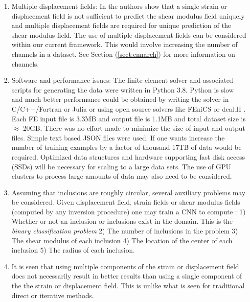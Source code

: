 \documentclass[12pt]{article}
\begin{document}
\begin{enumerate}
\item{Multiple displacement fields: In \cite{paper:barbonegokhale,paper:barbonebamber} the authors show that a single strain or displacement field is not sufficient to predict the shear modulus field uniquely and multiple displacement fields are required for unique prediction of the shear modulus field. The use of multiple displacement fields can be considered within our current framework. This would involve increasing the number of channels in a dataset. See Section (\ref{sect:cnnarch}) for more information on channels.} 
\item{Software and performance issues: The finite element solver and associated scripts for generating the data were written in Python 3.8. Python is slow and much better performance could be obtained by writing the solver in C/C++/Fortran or Julia or using open source solvers like FEniCS \cite{paper:fenics} or deal.II \cite{misc:deal.ii}. Each FE input file is 3.3MB and output file is 1.1MB and total dataset size is $\approx$  20GB. There was no effort made to minimize the size of input and output files. Simple text based JSON files were used. If one wants increase the number of training examples by a factor of thousand 17TB of data would be required. Optimized data structures and hardware supporting fast disk access (SSDs) will be necessary for scaling to a large data sets. The use of GPU clusters to process large amounts of data may also need to be considered. }
\item{Assuming that inclusions are roughly circular, several auxiliary problems may be considered. Given displacement field, strain fields or shear modulus fields (computed by any inversion procedure) one may train a CNN to compute : 1) Whether or not an inclusion or inclusions exist  in the domain. This is the \textit{binary classification problem} 2) The number of inclusions in the problem 3) The shear modulus of each inclusion 4) The location of the center of each inclusion 5) The radius of each inclusion. }
\item{It is seen that using multiple components of the strain or displacement field does not necessarily result in better results than using a single component of the the strain or displacement field. This is unlike what is seen for traditional direct or iterative methods.}
\end{enumerate}
\clearpage
{}

\end{document}
